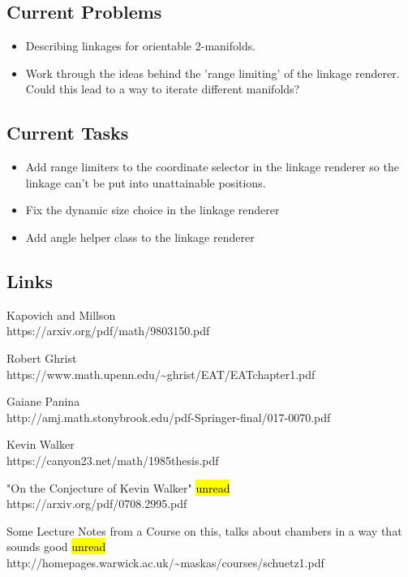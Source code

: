 \documentclass[
]{article}
\begin{document}
\hypertarget{header-n19}{%
\subsection{Current Problems}\label{header-n19}}

\begin{itemize}
\item
  Describing linkages for orientable 2-manifolds.
\item
  Work through the ideas behind the 'range limiting' of the linkage
  renderer. Could this lead to a way to iterate different manifolds?
\end{itemize}

\hypertarget{header-n25}{%
\subsection{Current Tasks}\label{header-n25}}

\begin{itemize}
\item
  Add range limiters to the coordinate selector in the linkage renderer
  so the linkage can't be put into unattainable positions.
\item
  Fix the dynamic size choice in the linkage renderer
\item
  Add angle helper class to the linkage renderer
\end{itemize}

\hypertarget{header-n33}{%
\subsection{Links}\label{header-n33}}

Kapovich and Millson \\
https://arxiv.org/pdf/math/9803150.pdf

Robert Ghrist\\
https://www.math.upenn.edu/\textasciitilde ghrist/EAT/EATchapter1.pdf

Gaiane Panina\\
http://amj.math.stonybrook.edu/pdf-Springer-final/017-0070.pdf

Kevin Walker\\
https://canyon23.net/math/1985thesis.pdf

"On the Conjecture of Kevin Walker" \hl{unread}\\
https://arxiv.org/pdf/0708.2995.pdf

Some Lecture Notes from a Course on this, talks about chambers in a way
that sounds good \hl{unread} \\
http://homepages.warwick.ac.uk/\textasciitilde maskas/courses/schuetz1.pdf
\end{document}

